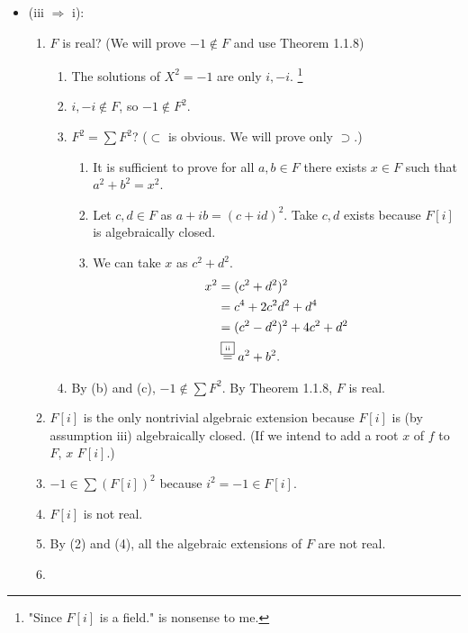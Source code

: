 \documentclass[9pt]{ltjsarticle}
\begin{document}
\begin{itemize}
\begin{itemize}
\begin{enumerate}
    \end{enumerate}
    \item
    (iii $\Rightarrow$ i):
    \begin{enumerate}
      \item
      $F$ is real? (We will prove $-1\notin F$ and use Theorem 1.1.8)
      \begin{enumerate}
        \item The solutions of $X^2 = -1$ are only $i, -i$.
        \footnote{"Since $F[i]$ is a field." is nonsense to me.}
        \item
        $i,-i \notin F$, so $-1 \notin F^2$.
        \item
        $F^2 = \sum F^2$? ($\subset$ is obvious.  We will prove only $\supset$.)
        \begin{enumerate}
          \item
          It is sufficient to prove for all $a,b\in F$ there exists $x\in F$ such that $a^2 + b^2 = x^2$.
          \item
          Let $c,d\in F$ as $a+ib = (c+id)^2$.
          Take $c,d$ exists because $F[i]$ is algebraically closed.
          \item
          We can take $x$ as $c^2+d^2$.\pf
          \begin{align}
            x^2
            &=
            (c^2 + d^2)^2\\
            &=
            c^4 + 2c^2d^2 + d^4\\
            &=
            (c^2-d^2)^2 + 4c^2+d^2\\
            &\overset{\text{\fbox{\tiny ii}}}{=}
            a^2 + b^2.
          \end{align}
        \end{enumerate}
        \item
        By (b) and (c), $-1 \notin \sum F^2$.
        \ite
        By Theorem 1.1.8, $F$ is real.
      \end{enumerate}
      \item
      $F[i]$ is the only nontrivial algebraic extension
      because $F[i]$ is (by assumption iii) algebraically closed.
      (If we intend to add a root $x$ of $f$ to $F$, $x$ \in $F[i]$.)
      \item
      $-1 \in \sum(F[i])^2$ because $i^2 = -1 \in F[i]$.
      \item
      $F[i]$ is not real.
      \item
      By (2) and (4), all the algebraic extensions of $F$ are not real.
      \item

\end{enumerate}
\end{itemize}
\end{itemize}
\end{document}
